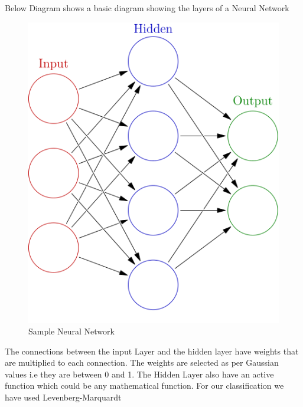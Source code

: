 \documentclass[12pt]{article}
\begin{document}
Below Diagram shows a basic diagram showing the layers of a Neural Network
\begin{figure}[H]
\center
\includegraphics [scale=0.5]{ann.png}
\caption{Sample Neural Network}
\end{figure}
The connections between the input Layer and the hidden layer have weights that are multiplied to each connection. The weights are selected as per Gaussian values i.e they are between 0 and 1.
The Hidden Layer also have an active function which could be any mathematical function. For our classification we have used Levenberg-Marquardt
\end{document}
